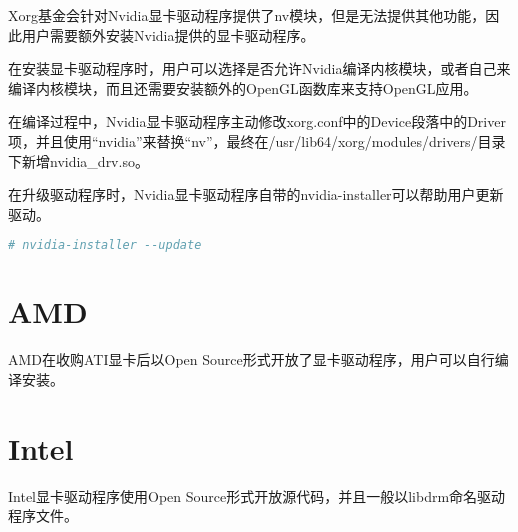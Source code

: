 Xorg基金会针对Nvidia显卡驱动程序提供了nv模块，但是无法提供其他功能，因此用户需要额外安装Nvidia提供的显卡驱动程序。

在安装显卡驱动程序时，用户可以选择是否允许Nvidia编译内核模块，或者自己来编译内核模块，而且还需要安装额外的OpenGL函数库来支持OpenGL应用。

在编译过程中，Nvidia显卡驱动程序主动修改xorg.conf中的Device段落中的Driver项，并且使用“nvidia”来替换“nv”，最终在/usr/lib64/xorg/modules/drivers/目录下新增nvidia\_drv.so。

在升级驱动程序时，Nvidia显卡驱动程序自带的nvidia-installer可以帮助用户更新驱动。



\begin{lstlisting}[language=bash]
# nvidia-installer --update
\end{lstlisting}


\section{AMD}

AMD在收购ATI显卡后以Open Source形式开放了显卡驱动程序，用户可以自行编译安装。




\section{Intel}

Intel显卡驱动程序使用Open Source形式开放源代码，并且一般以libdrm命名驱动程序文件。


